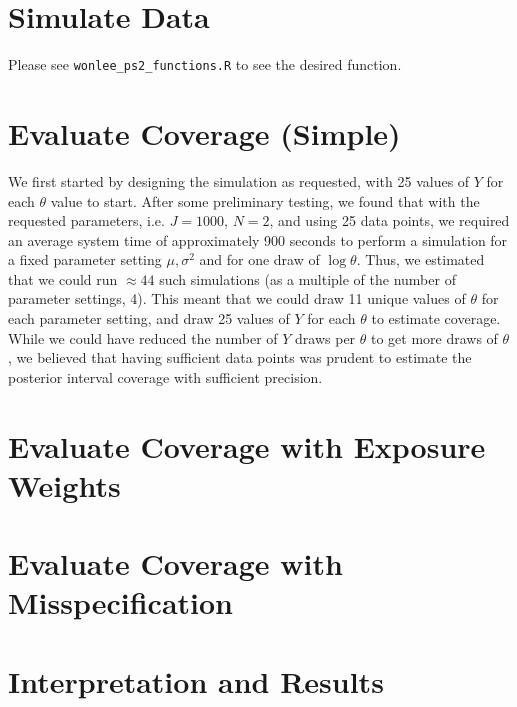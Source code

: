 \documentclass[psamsfonts]{amsart}
\theoremstyle{definition}
\theoremstyle{remark}
\numberwithin{equation}{section}
\begin{document}
\section{Simulate Data}

Please see \texttt{wonlee\_ps2\_functions.R} to see the desired function.

\section{Evaluate Coverage (Simple)}

We first started by designing the simulation as requested, with 25 values of $Y$ for each $\theta$ value to start. After some preliminary testing, we found that with the requested parameters, i.e. $J=1000$, $N=2$, and using 25 data points, we required an average system time of approximately 900 seconds to perform a simulation for a fixed parameter setting $\mu, \sigma^2$ and for one draw of $\log \theta$. Thus, we estimated that we could run $\approx 44$ such simulations (as a multiple of the number of parameter settings, 4). This meant that we could draw 11 unique values of $\theta$ for each parameter setting, and draw 25 values of $Y$ for each $\theta$ to estimate coverage. While we could have reduced the number of $Y$ draws per $\theta$ to get more draws of $\theta$, we believed that having sufficient data points was prudent to estimate the posterior interval coverage with sufficient precision.

\section{Evaluate Coverage with Exposure Weights}

\section{Evaluate Coverage with Misspecification}

\section{Interpretation and Results}
\end{document}
